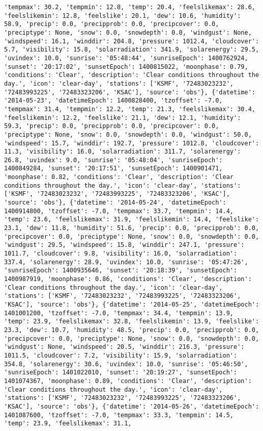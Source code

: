\documentclass[
  letterpaper,
  DIV=11,
  numbers=noendperiod]{scrartcl}
\begin{document}
\begin{verbatim}
'tempmax': 30.2, 'tempmin': 12.8, 'temp': 20.4, 'feelslikemax': 28.6, 'feelslikemin': 12.8, 'feelslike': 20.1, 'dew': 10.6, 'humidity': 58.9, 'precip': 0.0, 'precipprob': 0.0, 'precipcover': 0.0, 'preciptype': None, 'snow': 0.0, 'snowdepth': 0.0, 'windgust': None, 'windspeed': 16.1, 'winddir': 204.8, 'pressure': 1012.4, 'cloudcover': 5.7, 'visibility': 15.8, 'solarradiation': 341.9, 'solarenergy': 29.5, 'uvindex': 10.0, 'sunrise': '05:48:44', 'sunriseEpoch': 1400762924, 'sunset': '20:17:02', 'sunsetEpoch': 1400815022, 'moonphase': 0.79, 'conditions': 'Clear', 'description': 'Clear conditions throughout the day.', 'icon': 'clear-day', 'stations': ['KSMF', '72483023232', '72483993225', '72483323206', 'KSAC'], 'source': 'obs'}, {'datetime': '2014-05-23', 'datetimeEpoch': 1400828400, 'tzoffset': -7.0, 'tempmax': 31.4, 'tempmin': 12.2, 'temp': 21.3, 'feelslikemax': 30.4, 'feelslikemin': 12.2, 'feelslike': 21.1, 'dew': 12.1, 'humidity': 59.3, 'precip': 0.0, 'precipprob': 0.0, 'precipcover': 0.0, 'preciptype': None, 'snow': 0.0, 'snowdepth': 0.0, 'windgust': 50.0, 'windspeed': 15.7, 'winddir': 192.7, 'pressure': 1012.8, 'cloudcover': 11.3, 'visibility': 16.0, 'solarradiation': 311.7, 'solarenergy': 26.8, 'uvindex': 9.0, 'sunrise': '05:48:04', 'sunriseEpoch': 1400849284, 'sunset': '20:17:51', 'sunsetEpoch': 1400901471, 'moonphase': 0.82, 'conditions': 'Clear', 'description': 'Clear conditions throughout the day.', 'icon': 'clear-day', 'stations': ['KSMF', '72483023232', '72483993225', '72483323206', 'KSAC'], 'source': 'obs'}, {'datetime': '2014-05-24', 'datetimeEpoch': 1400914800, 'tzoffset': -7.0, 'tempmax': 33.7, 'tempmin': 14.4, 'temp': 23.6, 'feelslikemax': 31.9, 'feelslikemin': 14.4, 'feelslike': 23.1, 'dew': 11.8, 'humidity': 51.6, 'precip': 0.0, 'precipprob': 0.0, 'precipcover': 0.0, 'preciptype': None, 'snow': 0.0, 'snowdepth': 0.0, 'windgust': 29.5, 'windspeed': 15.8, 'winddir': 247.1, 'pressure': 1011.7, 'cloudcover': 9.8, 'visibility': 16.0, 'solarradiation': 337.4, 'solarenergy': 28.9, 'uvindex': 10.0, 'sunrise': '05:47:26', 'sunriseEpoch': 1400935646, 'sunset': '20:18:39', 'sunsetEpoch': 1400987919, 'moonphase': 0.86, 'conditions': 'Clear', 'description': 'Clear conditions throughout the day.', 'icon': 'clear-day', 'stations': ['KSMF', '72483023232', '72483993225', '72483323206', 'KSAC'], 'source': 'obs'}, {'datetime': '2014-05-25', 'datetimeEpoch': 1401001200, 'tzoffset': -7.0, 'tempmax': 34.4, 'tempmin': 13.9, 'temp': 23.9, 'feelslikemax': 32.8, 'feelslikemin': 13.9, 'feelslike': 23.3, 'dew': 10.7, 'humidity': 48.5, 'precip': 0.0, 'precipprob': 0.0, 'precipcover': 0.0, 'preciptype': None, 'snow': 0.0, 'snowdepth': 0.0, 'windgust': None, 'windspeed': 20.5, 'winddir': 216.3, 'pressure': 1011.5, 'cloudcover': 7.2, 'visibility': 15.9, 'solarradiation': 354.8, 'solarenergy': 30.6, 'uvindex': 10.0, 'sunrise': '05:46:50', 'sunriseEpoch': 1401022010, 'sunset': '20:19:27', 'sunsetEpoch': 1401074367, 'moonphase': 0.89, 'conditions': 'Clear', 'description': 'Clear conditions throughout the day.', 'icon': 'clear-day', 'stations': ['KSMF', '72483023232', '72483993225', '72483323206', 'KSAC'], 'source': 'obs'}, {'datetime': '2014-05-26', 'datetimeEpoch': 1401087600, 'tzoffset': -7.0, 'tempmax': 33.3, 'tempmin': 14.5, 'temp': 23.9, 'feelslikemax': 31.1, 
\end{verbatim}
\end{document}

